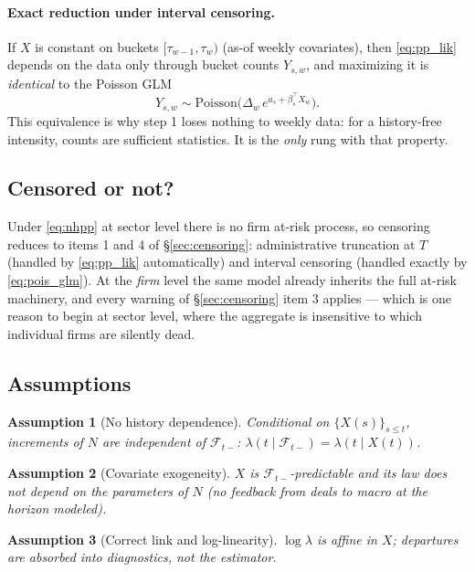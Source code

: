 \documentclass[11pt]{article}
\newcommand{\cF}{\mathcal{F}}
\newtheorem{assumption}{Assumption}
\numberwithin{assumption}{section}
\numberwithin{proposition}{section}
\numberwithin{remark}{section}
\begin{document}
\paragraph{Exact reduction under interval censoring.} If $X$ is constant on
buckets $[\tau_{w-1},\tau_w)$ (as-of weekly covariates), then
\eqref{eq:pp_lik} depends on the data only through bucket counts
$Y_{s,w}$, and maximizing it is \emph{identical} to the Poisson GLM
\begin{equation}
Y_{s,w}\sim\mathrm{Poisson}\!\big(\Delta_w\,e^{a_s+\beta_s^\top X_w}\big).
\label{eq:pois_glm}
\end{equation}
This equivalence is why step 1 loses nothing to weekly data: for a
history-free intensity, counts are sufficient statistics. It is the
\emph{only} rung with that property.

\subsection{Censored or not?}
Under \eqref{eq:nhpp} at sector level there is no firm at-risk process, so
censoring reduces to items 1 and 4 of \S\ref{sec:censoring}: administrative
truncation at $T$ (handled by \eqref{eq:pp_lik} automatically) and interval
censoring (handled exactly by \eqref{eq:pois_glm}). At the \emph{firm} level
the same model already inherits the full at-risk machinery, and every
warning of \S\ref{sec:censoring} item 3 applies --- which is one reason to
begin at sector level, where the aggregate is insensitive to which
individual firms are silently dead.

\subsection{Assumptions}
\begin{assumption}[No history dependence]\label{as:nhpp_indep}
Conditional on $\{X(s)\}_{s\le t}$, increments of $N$ are independent of
$\cF_{t-}$: $\lambda(t\mid\cF_{t-})=\lambda(t\mid X(t))$.
\end{assumption}
\begin{assumption}[Covariate exogeneity]\label{as:nhpp_exo}
$X$ is $\cF_{t-}$-predictable and its law does not depend on the parameters
of $N$ (no feedback from deals to macro at the horizon modeled).
\end{assumption}
\begin{assumption}[Correct link and log-linearity]\label{as:nhpp_link}
$\log\lambda$ is affine in $X$; departures are absorbed into diagnostics,
not the estimator.
\end{assumption}
\end{document}
